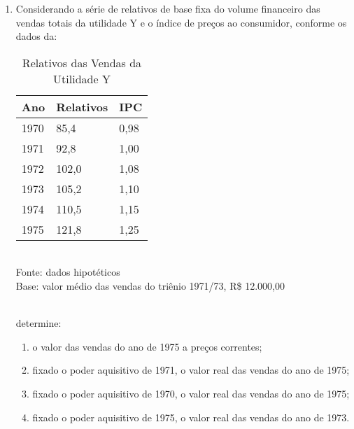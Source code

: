 \begin{enumerate}[resume]
\item Considerando a série de relativos de base fixa do volume financeiro das vendas totais da utilidade Y e o índice de preços ao consumidor, conforme os dados da:
	\begin{table}[!htb]
	\centering
	\caption{Relativos das Vendas da Utilidade Y}
	\vspace{0.5cm}
	\begin{tabular}{lll}
	Ano & Relativos & IPC \\
	\hline 
	1970 & 85,4 & 0,98  \\
	1971 & 92,8 & 1,00  \\
	1972 & 102,0 & 1,08  \\
	1973 & 105,2 & 1,10  \\
	1974 & 110,5 & 1,15  \\
	1975 & 121,8 & 1,25  \\			
	\end{tabular}\\
	Fonte: dados hipotéticos\\
	Base: valor médio das vendas do triênio 1971/73, R\$ 12.000,00
	\end{table}		
	\\
	determine:
	\begin{enumerate}
	\item o valor das vendas do ano de 1975 a preços correntes;
	\item fixado o poder aquisitivo de 1971, o valor real das vendas do ano de 1975;
	\item fixado o poder aquisitivo de 1970, o valor real das vendas do ano de 1975;
	\item fixado o poder aquisitivo de 1975, o valor real das vendas do ano de 1973.
	\end{enumerate}	


\end{enumerate}
